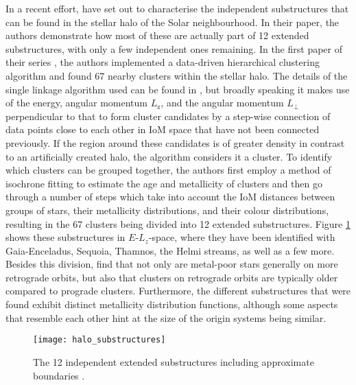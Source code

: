 \documentclass[a4paper,11pt]{article}
\begin{document}
In a recent effort, \citet{ruizlara22} have set out to characterise the independent substructures that can be found in the stellar halo of the Solar neighbourhood. In their paper, the authors demonstrate how most of these are actually part of 12 extended substructures, with only a few independent ones remaining. In the first paper of their series \citep{lovdal22}, the authors implemented a data-driven hierarchical clustering algorithm and found 67 nearby clusters within the stellar halo. The details of the single linkage algorithm used can be found in \citet{lovdal22}, but broadly speaking it makes use of the energy, angular momentum $L_\mathrm{z}$, and the angular momentum $L_\perp$ perpendicular to that to form cluster candidates by a step-wise connection of data points close to each other in IoM space that have not been connected previously. If the region around these candidates is of greater density in contrast to an artificially created halo, the algorithm considers it a cluster. To identify which clusters can be grouped together, the authors first employ a method of isochrone fitting to estimate the age and metallicity of clusters and then go through a number of steps which take into account the IoM distances between groups of stars, their metallicity distributions, and their colour distributions, resulting in the 67 clusters being divided into 12 extended substructures. Figure \ref{fig:halo_substructures} shows these substructures in $E$-$L_z$-space, where they have been identified with Gaia-Enceladus, Sequoia, Thamnos, the Helmi streams, as well as a few more. Besides this division, \citet{ruizlara22} find that not only are metal-poor stars generally on more retrograde orbits, but also that clusters on retrograde orbits are typically older compared to prograde clusters. Furthermore, the different substructures that were found exhibit distinct metallicity distribution functions, although some aspects that resemble each other hint at the size of the origin systems being similar.
%
\begin{figure}
 \centering
 \texttt{[image: halo\_substructures]}
 \caption[Substructures within the local stellar halo]{The 12 independent extended substructures including approximate boundaries \citep{ruizlara22}.}
 \label{fig:halo_substructures}
\end{figure}\\ \\
%
\end{document}
